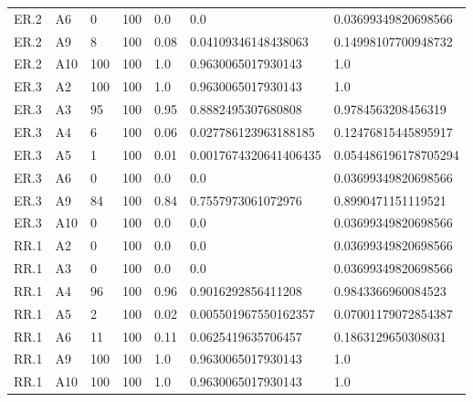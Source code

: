 \begin{tabular}{lllllll}
ER.2 & A6 & 0 & 100 & 0.0 & 0.0 & 0.03699349820698566 \\
ER.2 & A9 & 8 & 100 & 0.08 & 0.04109346148438063 & 0.14998107700948732 \\
ER.2 & A10 & 100 & 100 & 1.0 & 0.9630065017930143 & 1.0 \\
ER.3 & A2 & 100 & 100 & 1.0 & 0.9630065017930143 & 1.0 \\
ER.3 & A3 & 95 & 100 & 0.95 & 0.8882495307680808 & 0.9784563208456319 \\
ER.3 & A4 & 6 & 100 & 0.06 & 0.027786123963188185 & 0.12476815445895917 \\
ER.3 & A5 & 1 & 100 & 0.01 & 0.0017674320641406435 & 0.054486196178705294 \\
ER.3 & A6 & 0 & 100 & 0.0 & 0.0 & 0.03699349820698566 \\
ER.3 & A9 & 84 & 100 & 0.84 & 0.7557973061072976 & 0.8990471151119521 \\
ER.3 & A10 & 0 & 100 & 0.0 & 0.0 & 0.03699349820698566 \\
RR.1 & A2 & 0 & 100 & 0.0 & 0.0 & 0.03699349820698566 \\
RR.1 & A3 & 0 & 100 & 0.0 & 0.0 & 0.03699349820698566 \\
RR.1 & A4 & 96 & 100 & 0.96 & 0.9016292856411208 & 0.9843366960084523 \\
RR.1 & A5 & 2 & 100 & 0.02 & 0.005501967550162357 & 0.07001179072854387 \\
RR.1 & A6 & 11 & 100 & 0.11 & 0.0625419635706457 & 0.1863129650308031 \\
RR.1 & A9 & 100 & 100 & 1.0 & 0.9630065017930143 & 1.0 \\
RR.1 & A10 & 100 & 100 & 1.0 & 0.9630065017930143 & 1.0 \\
\hline
\end{tabular}